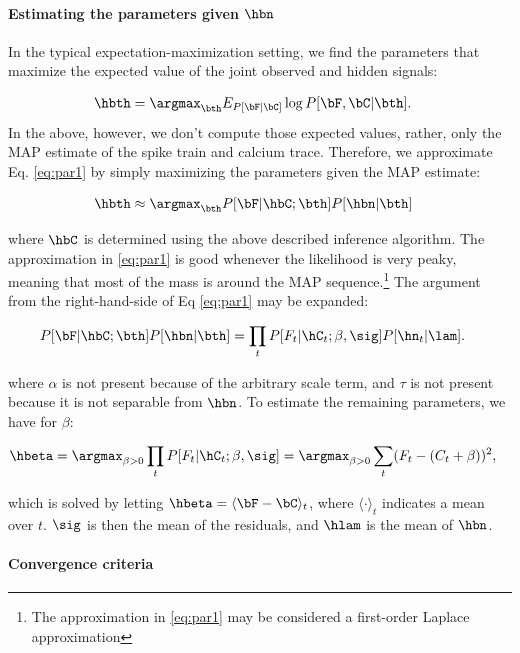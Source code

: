 \paragraph{Estimating the parameters given $\hbn$}

In the typical expectation-maximization setting, we find the parameters that maximize the expected value of the joint observed and hidden signals:

\begin{align} \label{eq:par1}
\hbth &= \argmax_{\bth} E_{P[\bF | \bC]} \log P[\bF, \bC | \bth].
\end{align}
In the above, however, we don't compute those expected values, rather, only the MAP estimate of the spike train and calcium trace.  Therefore, we approximate Eq. \eqref{eq:par1} by simply maximizing the parameters given the MAP estimate:

\begin{align} \label{eq:par2}
\hbth &\approx \argmax_{\bth} P[\bF| \hbC; \bth] P[\hbn | \bth]
\end{align}

\noindent where $\hbC$ is determined using the above described inference algorithm. The approximation in \eqref{eq:par1} is good whenever the likelihood is very peaky, meaning that most of the mass is around the MAP sequence.\footnote{The approximation in \eqref{eq:par1} may be considered a first-order Laplace approximation}   The argument from the right-hand-side of Eq \eqref{eq:par1} may be expanded: 

\begin{align} \label{eq:par2}
P[\bF| \hbC; \bth] P[\hbn | \bth] &= \prod_t P[F_t | \hC_t; \beta,\sig]  P[\hn_t | \lam].
\end{align}

\noindent where $\alpha$ is not present because of the arbitrary scale term, and $\tau$ is not present because it is not separable from $\hbn$. To estimate the remaining parameters, we have for $\beta$:

\begin{align}
	\hbeta &= \argmax_{\beta >0} \prod_t P[F_t | \hC_t; \beta,\sig] = \argmax_{\beta>0} \sum_t (F_t - (C_t + \beta))^2,
\end{align}

\noindent which is solved by letting $\hbeta=\langle \bF-\bC \rangle_t$, where $\langle \cdot \rangle_t$ indicates a mean over $t$.  $\sig$ is then the mean of the residuals, and $\hlam$ is the mean of $\hbn$. 

\paragraph{Convergence criteria}

